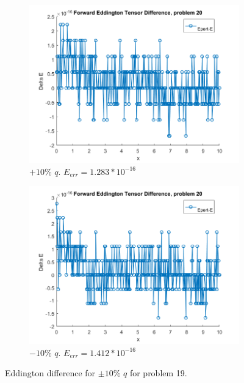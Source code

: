 \documentclass{article}
\begin{document}
\begin{figure}[H]
\centering
\begin{subfigure}{.5\textwidth}
  \centering
  \includegraphics[width=1\linewidth]{p20deltaEdq.png}
  \caption{$+10\%$ $q$. $E_{err}=1.283*10^{-16}$}
  \label{fig:sub1}
\end{subfigure}%
\begin{subfigure}{.5\textwidth}
  \centering
  \includegraphics[width=1\linewidth]{p20deltaEdq-10.png}
  \caption{$-10\%$ $q$. $E_{err}=1.412*10^{-16}$}
  \label{fig:sub2}
\end{subfigure}
\caption{Eddington difference for $\pm10\%$ $q$ for problem 19.}
\label{fig:test}
\end{figure}
\end{document}
